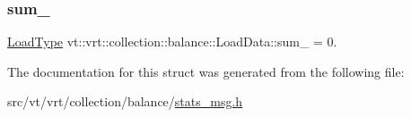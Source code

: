 \mbox{\label{structvt_1_1vrt_1_1collection_1_1balance_1_1_load_data_a3f32c0fbcce57bb133a1fcb51b996877}} 
\subsubsection{\texorpdfstring{sum\+\_\+}{sum\_}}
{\footnotesize\ttfamily \hyperlink{namespacevt_a8fb51741340b87d7aaee0bef60e9896b}{Load\+Type} vt\+::vrt\+::collection\+::balance\+::\+Load\+Data\+::sum\+\_\+ = 0.}



The documentation for this struct was generated from the following file\+:\begin{DoxyCompactItemize}
\item 
src/vt/vrt/collection/balance/\hyperlink{stats__msg_8h}{stats\+\_\+msg.\+h}\end{DoxyCompactItemize}
